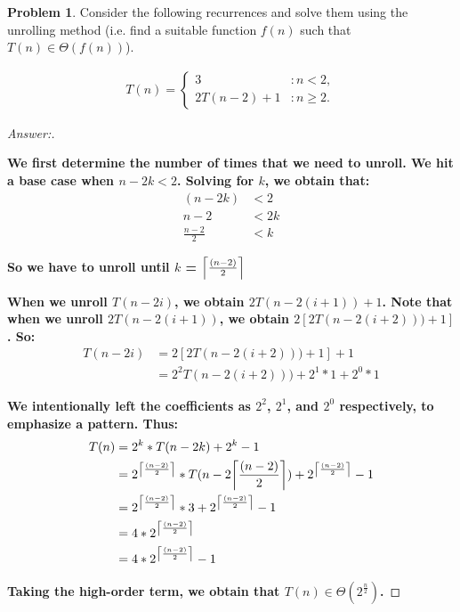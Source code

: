 \documentclass[11pt]{article}
\theoremstyle{definition}
\theoremstyle{definition}
\newtheorem{required}{Problem}
\theoremstyle{definition}
\begin{document}
\begin{required} \label{Unrolling1}
Consider the following recurrences and solve them using the unrolling method (i.e. find a suitable function $f(n)$ such that $T(n) \in \Theta(f(n))$). 
\begin{enumerate} [label=(\alph*)]
    \item 
\begin{align*}
T(n) = \begin{cases}
3 & : n < 2, \\
2T(n - 2) + 1 & : n \geq 2.
\end{cases}
\end{align*}

\begin{proof}[Answer:] \
\item \textbf{We first determine the number of times that we need to unroll. We hit a base case when $n - 2k < 2$. Solving for $k$, we obtain that:}
\begin{align*}
(n - 2k) &< 2 \\
n - 2 &< 2k \\
\frac{n - 2}{2} &< k
\end{align*}

\DeclarePairedDelimiter{\ceil}{\lceil}{\rceil}
\item \textbf{So we have to unroll until $k$ = $\ceil*{\frac{(n - 2)}{2}}$}
\item \textbf{When we unroll $T(n - 2i)$, we obtain $2T(n - 2(i + 1)) + 1$. Note that when we unroll $2T(n - 2(i + 1))$, we obtain $2[2T(n-2(i+2)))+1]$. So:}
\begin{align*}
T(n - 2i) &= 2[2T(n-2(i+2)))+1] + 1 \\
&= 2^{2}T(n - 2(i + 2))) + 2^{1} * 1 + 2^{0} * 1
\end{align*}
\item \textbf{We intentionally left the coefficients as $2^2$, $2^1$, and $2^0$ respectively, to emphasize a pattern. Thus:}
\begin{align*}
T(n) &= 2^{k} * T(n - 2k) +2^{k} - 1 \\
&= 2^{\ceil*{\frac{(n - 2)}{2}}} * T(n - 2\ceil*{\frac{(n - 2)}{2}}) +2^{\ceil*{\frac{(n - 2)}{2}}} - 1 \\
&= 2^{\ceil*{\frac{(n - 2)}{2}}} * 3 + 2^{\ceil*{\frac{(n - 2)}{2}}} - 1 \\
&= 4 * 2^{\ceil*{\frac{(n - 2)}{2}}} \\
&= 4 * 2^{\ceil*{\frac{(n - 2)}{2}}} - 1
\end{align*}
\item \textbf{Taking the high-order term, we obtain that $T(n) \in \Theta(2^{\frac{n}{2}})$.}
\end{proof}


\end{enumerate}
\end{required}
\end{document}
